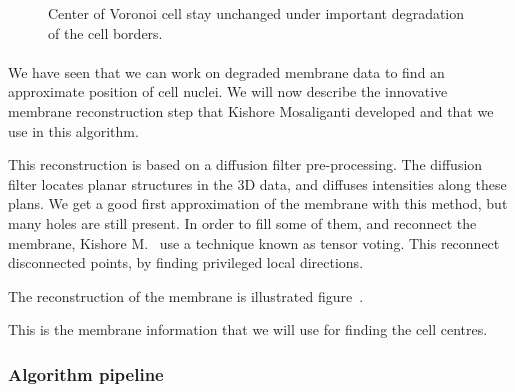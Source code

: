 \begin{figure}[h]
\caption{Center of Voronoi cell stay unchanged under important degradation of the cell borders.}
  \label{fig:incompleteMembraneSynthetic}
\end{figure}

\paragraph*{}
We have seen that we can work on degraded membrane data to find an approximate position of cell nuclei.
We will now describe the innovative membrane reconstruction step that Kishore Mosaliganti developed and that we use in this algorithm.


This reconstruction is based on a diffusion filter pre-processing. The diffusion filter locates planar structures in the 3D data, and diffuses intensities along these plans.
We get a good first approximation of the membrane with this method, but many holes are still present.
In order to fill some of them, and reconnect the membrane, Kishore M.~{\etal} use a technique known as tensor voting.
This reconnect disconnected points, by finding privileged local directions.

The reconstruction of the membrane is illustrated figure~.

This is the membrane information that we will use for finding the cell centres.





\subsubsection{Algorithm pipeline}

